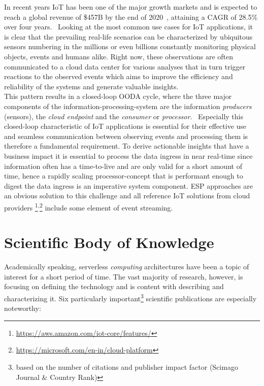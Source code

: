 In recent years \acf{IoT} has been one of the major growth markets and is expected to reach a global revenue of \$457B by the end of 2020~, attaining a \acf{CAGR} of 28.5\% over four years.~ Looking at the most common use cases for IoT applications, it is clear that the prevailing real-life scenarios can be characterized by ubiquitous sensors numbering in the millions or even billions constantly monitoring physical objects, events and humans alike. Right now, these observations are often communicated to a cloud data center for various analyses that in turn trigger reactions to the observed events which aims to improve the efficiency and reliability of the systems and generate valuable insights.~ \\
This pattern results in a closed-loop \acf{OODA} cycle, where the three major components of the information-processing-system are the information \textit{producers} (sensors), the \textit{cloud endpoint} and the \textit{consumer} or \textit{processor}.~ Especially this closed-loop characteristic of IoT applications is essential for their effective use and seamless communication between observing events and processing them is therefore a fundamental requirement. To derive actionable insights that have a business impact it is essential to process the data ingress in near real-time since information often has a time-to-live and are only valid for a short amount of time, hence a rapidly scaling processor-concept that is performant enough to digest the data ingress is an imperative system component. \acf{ESP} approaches are an obvious solution to this challenge and all reference IoT solutions from cloud providers \footnote{\url{https://aws.amazon.com/iot-core/features/}}\textsuperscript{,}\footnote{\url{https://microsoft.com/en-in/cloud-platform}} include some element of event streaming.

\section{Scientific Body of Knowledge}\label{chp:bodyOfKnow}

Academically speaking, serverless \textit{computing} architectures have been a topic of interest for a short period of time. The vast majority of research, however, is focusing on defining the technology and is content with describing and characterizing it. Six particularly important\footnote{based on the number of citations and publisher impact factor (Scimago Journal \& Country Rank)} scientific publications are especially noteworthy:


